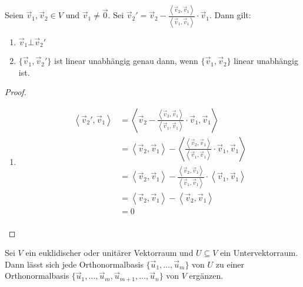 \documentclass{report}
\renewcommand{\vu}{\vec{u}}
\newcommand{\vv}{\vec{v}}
\newcommand{\vz}{\vec{0}}
\newcommand{\scalar}[2]{\left\langle #1, #2 \right\rangle}
\begin{document}
\begin{theorem}
 Seien $\vv_1, \vv_2 \in V$ und $\vv_1 \neq \vz$. Sei $\vv_2' = \vv_2 - \frac{\scalar{\vv_2}{\vv_1}}{\scalar{\vv_1}{\vv_1}} \cdot \vv_1$. Dann gilt:
 \begin{enumerate}
  \item $\vv_1 \bot \vv_2'$
  \item $\{\vv_1, \vv_2'\}$ ist linear unabhängig genau dann, wenn $\{\vv_1, \vv_2\}$ linear unabhängig ist.
 \end{enumerate}
 \begin{proof}
  \begin{enumerate}
   \item \begin{align*}
          \scalar{\vv_2'}{\vv_1} &= \scalar{\vv_2 - \frac{\scalar{\vv_2}{\vv_1}}{\scalar{\vv_1}{\vv_1}} \cdot \vv_1}{\vv_1}\\
          &= \scalar{\vv_2}{\vv_1} - \scalar{\frac{\scalar{\vv_2}{\vv_1}}{\scalar{\vv_1}{\vv_1}} \cdot\vv_1}{\vv_1}\\
          &= \scalar{\vv_2}{\vv_1} - \frac{\scalar{\vv_2}{\vv_1}}{\scalar{\vv_1}{\vv_1}} \cdot \scalar{\vv_1}{\vv_1}\\
          &= \scalar{\vv_2}{\vv_1} - \scalar{\vv_2}{\vv_1}\\
          &= 0\\
         \end{align*}
  \end{enumerate}
 \end{proof}
\end{theorem}
\begin{theorem}
 Sei $V$ ein euklidischer oder unitärer Vektorraum und $U \subseteq V$ ein Untervektorraum. Dann lässt sich jede Orthonormalbasis $\{\vu_1, \hdots, \vu_m\}$ von $U$ zu einer Orthonormalbasis $\{\vu_1, \hdots, \vu_m, \vu_{m+1}, \hdots, \vu_{n}\}$ von $V$ ergänzen.
\end{theorem}
\end{document}
